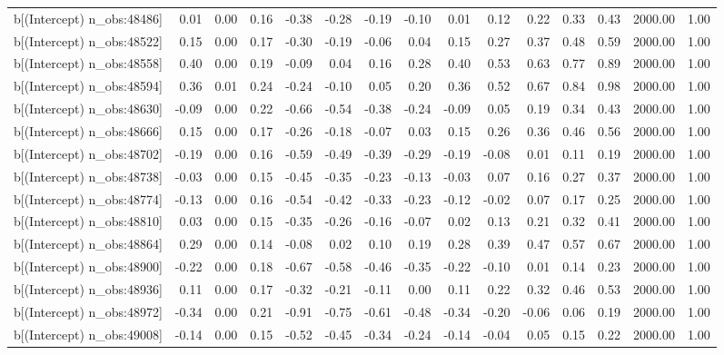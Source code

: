 \begin{table}[ht]
\begin{tabular}{rrrrrrrrrrrrrrr}
  b[(Intercept) n\_obs:48486] & 0.01 & 0.00 & 0.16 & -0.38 & -0.28 & -0.19 & -0.10 & 0.01 & 0.12 & 0.22 & 0.33 & 0.43 & 2000.00 & 1.00 \\ 
  b[(Intercept) n\_obs:48522] & 0.15 & 0.00 & 0.17 & -0.30 & -0.19 & -0.06 & 0.04 & 0.15 & 0.27 & 0.37 & 0.48 & 0.59 & 2000.00 & 1.00 \\ 
  b[(Intercept) n\_obs:48558] & 0.40 & 0.00 & 0.19 & -0.09 & 0.04 & 0.16 & 0.28 & 0.40 & 0.53 & 0.63 & 0.77 & 0.89 & 2000.00 & 1.00 \\ 
  b[(Intercept) n\_obs:48594] & 0.36 & 0.01 & 0.24 & -0.24 & -0.10 & 0.05 & 0.20 & 0.36 & 0.52 & 0.67 & 0.84 & 0.98 & 2000.00 & 1.00 \\ 
  b[(Intercept) n\_obs:48630] & -0.09 & 0.00 & 0.22 & -0.66 & -0.54 & -0.38 & -0.24 & -0.09 & 0.05 & 0.19 & 0.34 & 0.43 & 2000.00 & 1.00 \\ 
  b[(Intercept) n\_obs:48666] & 0.15 & 0.00 & 0.17 & -0.26 & -0.18 & -0.07 & 0.03 & 0.15 & 0.26 & 0.36 & 0.46 & 0.56 & 2000.00 & 1.00 \\ 
  b[(Intercept) n\_obs:48702] & -0.19 & 0.00 & 0.16 & -0.59 & -0.49 & -0.39 & -0.29 & -0.19 & -0.08 & 0.01 & 0.11 & 0.19 & 2000.00 & 1.00 \\ 
  b[(Intercept) n\_obs:48738] & -0.03 & 0.00 & 0.15 & -0.45 & -0.35 & -0.23 & -0.13 & -0.03 & 0.07 & 0.16 & 0.27 & 0.37 & 2000.00 & 1.00 \\ 
  b[(Intercept) n\_obs:48774] & -0.13 & 0.00 & 0.16 & -0.54 & -0.42 & -0.33 & -0.23 & -0.12 & -0.02 & 0.07 & 0.17 & 0.25 & 2000.00 & 1.00 \\ 
  b[(Intercept) n\_obs:48810] & 0.03 & 0.00 & 0.15 & -0.35 & -0.26 & -0.16 & -0.07 & 0.02 & 0.13 & 0.21 & 0.32 & 0.41 & 2000.00 & 1.00 \\ 
  b[(Intercept) n\_obs:48864] & 0.29 & 0.00 & 0.14 & -0.08 & 0.02 & 0.10 & 0.19 & 0.28 & 0.39 & 0.47 & 0.57 & 0.67 & 2000.00 & 1.00 \\ 
  b[(Intercept) n\_obs:48900] & -0.22 & 0.00 & 0.18 & -0.67 & -0.58 & -0.46 & -0.35 & -0.22 & -0.10 & 0.01 & 0.14 & 0.23 & 2000.00 & 1.00 \\ 
  b[(Intercept) n\_obs:48936] & 0.11 & 0.00 & 0.17 & -0.32 & -0.21 & -0.11 & 0.00 & 0.11 & 0.22 & 0.32 & 0.46 & 0.53 & 2000.00 & 1.00 \\ 
  b[(Intercept) n\_obs:48972] & -0.34 & 0.00 & 0.21 & -0.91 & -0.75 & -0.61 & -0.48 & -0.34 & -0.20 & -0.06 & 0.06 & 0.19 & 2000.00 & 1.00 \\ 
  b[(Intercept) n\_obs:49008] & -0.14 & 0.00 & 0.15 & -0.52 & -0.45 & -0.34 & -0.24 & -0.14 & -0.04 & 0.05 & 0.15 & 0.22 & 2000.00 & 1.00 \\ 

\end{tabular}
\end{table}
